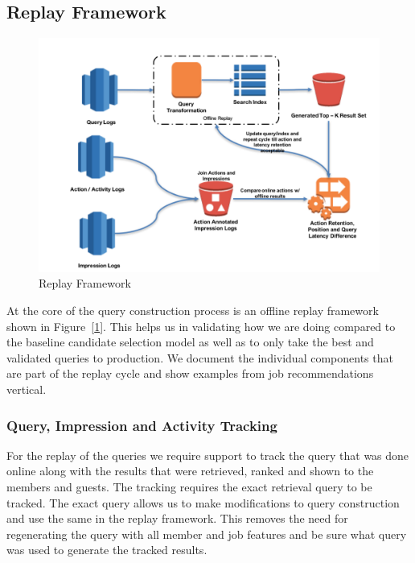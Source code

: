 \subsection{Replay Framework} \label{sec:replay-framework}

\begin{figure}
\centering
\includegraphics[scale=0.90]{replay-architecture.png}
\caption{Replay Framework}
\label{fig:replay-architecture}
\end{figure}

At the core of the query construction process is an offline replay framework
shown in Figure~[\ref{fig:replay-architecture}]. This helps us in validating how we 
are doing compared to the baseline candidate selection model as well as to only 
take the best and validated queries to production.
We document the individual components that are part of the replay cycle and show 
examples from job recommendations vertical.

\subsubsection{Query, Impression and Activity Tracking}

For the replay of the queries we require support to track the query that 
was done online along with the results that were retrieved, ranked and 
shown to the members and guests. The tracking requires the exact retrieval 
query to be tracked. 
The exact query allows us to make modifications to query construction 
and use the same in the replay framework. This removes the need 
for regenerating the query with all member and job features and be sure 
what query was used to generate the tracked results. 

